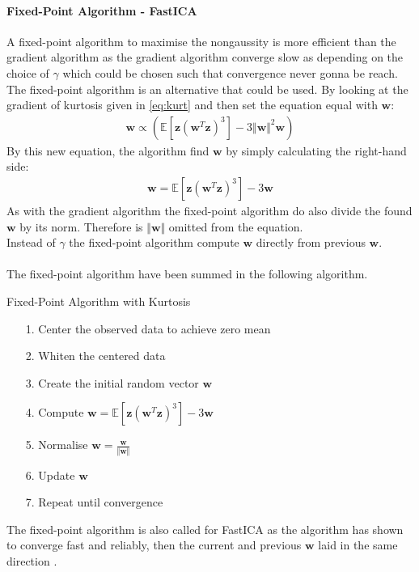 \paragraph{Fixed-Point Algorithm - FastICA}
A fixed-point algorithm to maximise the nongaussity is more efficient than the gradient algorithm as the gradient algorithm converge slow as depending on the choice of $\gamma$ which could be chosen such that convergence never gonna be reach. The fixed-point algorithm is an alternative that could be used.
By looking at the gradient of kurtosis given in \eqref{eq:kurt} and then set the equation equal with $\mathbf{w}$:
\begin{align*}
\mathbf{w} \propto ( \mathbb{E}[\mathbf{z}(\mathbf{w}^T \mathbf{z})^3] - 3 \Vert \mathbf{w} \Vert^2 \mathbf{w})
\end{align*}
By this new equation, the algorithm find $\mathbf{w}$ by simply calculating the right-hand side:
\begin{align*}
\mathbf{w} = \mathbb{E}[\mathbf{z}(\mathbf{w}^T \mathbf{z})^3] - 3 \mathbf{w}
\end{align*}
As with the gradient algorithm the fixed-point algorithm do also divide the found $\mathbf{w}$ by its norm. Therefore is $\Vert \mathbf{w} \Vert$ omitted from the equation.
\\
Instead of $\gamma$ the fixed-point algorithm compute $\mathbf{w}$ directly from previous $\mathbf{w}$.
\\ \\
The fixed-point algorithm have been summed in the following algorithm.
\begin{algorithm}[H]
\caption{Fixed-Point Algorithm with Kurtosis}
\begin{itemize}
\item[1.] Center the observed data to achieve zero mean
\item[2.] Whiten the centered data
\item[3.] Create the initial random vector $\mathbf{w}$ 
\item[4.] Compute $\mathbf{w} = \mathbb{E}[\mathbf{z}(\mathbf{w}^T \mathbf{z})^3] - 3 \mathbf{w}$
\item[5.] Normalise $\mathbf{w} = \frac{\mathbf{w}}{\Vert \mathbf{w} \Vert}$
\item[6.] Update $\mathbf{w}$
\item[7.] Repeat until convergence
\end{itemize}
\end{algorithm}
The fixed-point algorithm is also called for FastICA as the algorithm has shown to converge fast and reliably, then the current and previous $\mathbf{w}$ laid in the same direction \cite[p. 179]{ICA}. 


